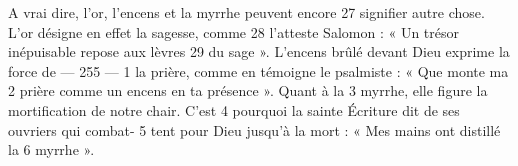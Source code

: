 A vrai dire, l'or, l'encens et la myrrhe peuvent encore	 
27	 	signifier autre chose. L'or désigne en effet la sagesse, comme	 
28	 	l'atteste Salomon : « Un trésor inépuisable repose aux lèvres	 
29	 	du sage ». L'encens brûlé devant Dieu exprime la force de	 
 	--- 255 ---	 
1	 	la prière, comme en témoigne le psalmiste : « Que monte ma	 
2	 	prière comme un encens en ta présence ». Quant à la	 
3	 	myrrhe, elle figure la mortification de notre chair. C'est	 
4	 	pourquoi la sainte Écriture dit de ses ouvriers qui combat-	 
5	 	tent pour Dieu jusqu'à la mort : « Mes mains ont distillé la	 
6	 	myrrhe ».
